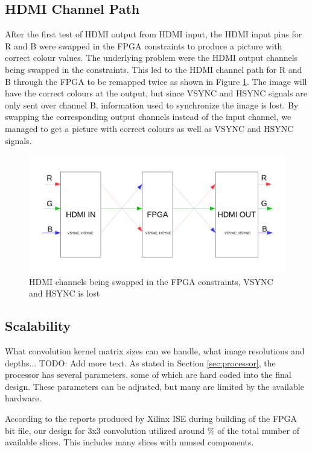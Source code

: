 \subsection{HDMI Channel Path}
After the first test of HDMI output from HDMI input, the HDMI input pins for R and B were swapped in the FPGA constraints to produce a picture with correct colour values.
The underlying problem were the HDMI output channels being swapped in the constraints. 
This led to the HDMI channel path for R and B through the FPGA to be remapped twice as shown in Figure \ref{fig:hdmiChannelPath}.
The image will have the correct colours at the output, but since VSYNC and HSYNC signals are only sent over channel B, information used to synchronize the image is lost.
By swapping the corresponding output channels instead of the input channel, we managed to get a picture with correct colours as well as VSYNC and HSYNC signals.

\begin{figure}[h!]
    \includegraphics[width=\linewidth]{img/hdmi_channel_path.pdf}
    \caption[HDMI channels being swapped in the FPGA constraints.]{HDMI channels being swapped in the FPGA constraints, VSYNC and HSYNC is lost}
    \label{fig:hdmiChannelPath}
\end{figure}

\subsection{Scalability}
What convolution kernel matrix sizes can we handle, what image resolutions and depths... TODO: Add more text.
As stated in Section \ref{sec:processor}, the processor has several parameters, some of which are hard coded into the final design.
These parameters can be adjusted, but many are limited by the available hardware.

According to the reports produced by Xilinx ISE during building of the FPGA bit file, our design for 3x3 convolution utilized around \unit[16]{\%} of the total number of available slices.
This includes many slices with unused components.

